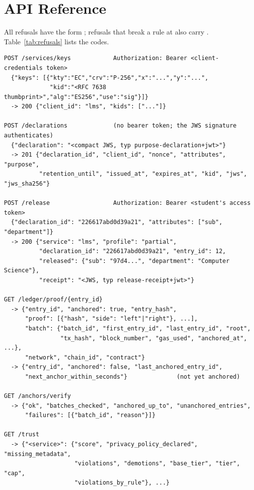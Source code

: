 \section{API Reference}
\label{app:api}

All refusals have the form ; refusals that break a rule at  also carry . Table~\ref{tab:refusals} lists the codes.

\begin{lstlisting}[caption={Requests and responses of the main endpoints}, label={lst:api}]
POST /services/keys            Authorization: Bearer <client-credentials token>
  {"keys": [{"kty":"EC","crv":"P-256","x":"...","y":"...",
             "kid":"<RFC 7638 thumbprint>","alg":"ES256","use":"sig"}]}
  -> 200 {"client_id": "lms", "kids": ["..."]}

POST /declarations             (no bearer token; the JWS signature authenticates)
  {"declaration": "<compact JWS, typ purpose-declaration+jwt>"}
  -> 201 {"declaration_id", "client_id", "nonce", "attributes", "purpose",
          "retention_until", "issued_at", "expires_at", "kid", "jws", "jws_sha256"}

POST /release                  Authorization: Bearer <student's access token>
  {"declaration_id": "226617abd0d39a21", "attributes": ["sub", "department"]}
  -> 200 {"service": "lms", "profile": "partial",
          "declaration_id": "226617abd0d39a21", "entry_id": 12,
          "released": {"sub": "97d4...", "department": "Computer Science"},
          "receipt": "<JWS, typ release-receipt+jwt>"}

GET /ledger/proof/{entry_id}
  -> {"entry_id", "anchored": true, "entry_hash",
      "proof": [{"hash", "side": "left"|"right"}, ...],
      "batch": {"batch_id", "first_entry_id", "last_entry_id", "root",
                "tx_hash", "block_number", "gas_used", "anchored_at", ...},
      "network", "chain_id", "contract"}
  -> {"entry_id", "anchored": false, "last_anchored_entry_id",
      "next_anchor_within_seconds"}              (not yet anchored)

GET /anchors/verify
  -> {"ok", "batches_checked", "anchored_up_to", "unanchored_entries",
      "failures": [{"batch_id", "reason"}]}

GET /trust
  -> {"<service>": {"score", "privacy_policy_declared", "missing_metadata",
                    "violations", "demotions", "base_tier", "tier", "cap",
                    "violations_by_rule"}, ...}
\end{lstlisting}


